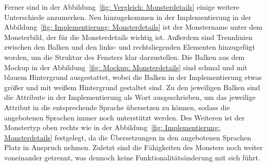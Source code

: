 Ferner sind in der Abbildung~\ref{fig: Vergleich: Monsterdetails} einige weitere Unterschiede anzumerken. Neu hinzugekommen in der Implementierung in der Abbildung~\ref{fig: Implementierung: Monsterdetails} ist der Monstername unter dem Monsterbild, der für die Monsterdetails wichtig ist. Außerdem sind Trennlinien zwischen den Balken und den links- und rechtsliegenden Elementen hinzugefügt worden, um die Struktur des Fensters klar darzustellen. Die Balken aus dem Mockup in der Abbildung~\ref{fig: Mockup: Monsterdetails} sind schmal und mit blauem Hintergrund ausgestattet, wobei die Balken in der Implementierung etwas größer und mit weißem Hintergrund gestaltet sind. Zu den jeweiligen Balken sind die Attribute in der Implementierung als Wort ausgeschrieben, um das jeweilige Attribut in die entsprechende Sprache übersetzen zu können, sodass die angebotenen Sprachen immer noch unterstützt werden.
Des Weiteren ist der Monstertyp oben rechts wie in der Abbildung~\ref{fig: Implementierung: Monsterdetails} festgelegt, da die Übersetzungen in den angebotenen Sprachen Platz in Anspruch nehmen.
Zuletzt sind die Fähigkeiten des Monsters noch weiter voneinander getrennt, was dennoch keine Funktionalitätsänderung mit sich führt.
